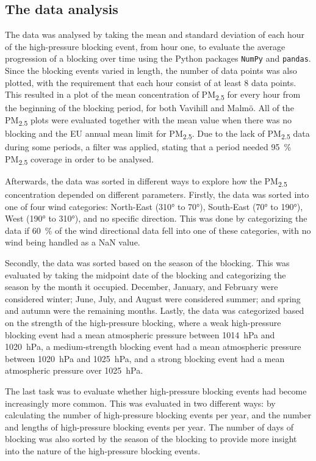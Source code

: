 \subsection{The data analysis}
The data was analysed by taking the mean and standard deviation of each hour of the high-pressure blocking event, from hour one, to evaluate the average progression of a blocking over time using the Python packages \texttt{NumPy} and \texttt{pandas}. Since the blocking events varied in length, the number of data points was also plotted, with the requirement that each hour consist of at least 8 data points. This resulted in a plot of the mean concentration of PM\textsubscript{2.5} for every hour from the beginning of the blocking period, for both Vavihill and Malmö. All of the PM\textsubscript{2.5} plots were evaluated together with the mean value when there was no blocking and the EU annual mean limit for PM\textsubscript{2.5}. Due to the lack of PM\textsubscript{2.5} data during some periods, a filter was applied, stating that a period needed \SI{95}{\%} PM\textsubscript{2.5} coverage in order to be analysed.

Afterwards, the data was sorted in different ways to explore how the PM\textsubscript{2.5} concentration depended on different parameters. Firstly, the data was sorted into one of four wind categories: North-East (310° to 70°), South-East (70° to 190°), West (190° to 310°), and no specific direction. This was done by categorizing the data if \SI{60}{\%} of the wind directional data fell into one of these categories, with no wind being handled as a NaN value.

Secondly, the data was sorted based on the season of the blocking. This was evaluated by taking the midpoint date of the blocking and categorizing the season by the month it occupied. December, January, and February were considered winter; June, July, and August were considered summer; and spring and autumn were the remaining months. Lastly, the data was categorized based on the strength of the high-pressure blocking, where a weak high-pressure blocking event had a mean atmospheric pressure between \SI{1014}{\hecto\pascal} and \SI{1020}{\hecto\pascal}, a medium-strength blocking event had a mean atmospheric pressure between \SI{1020}{\hecto\pascal} and \SI{1025}{\hecto\pascal}, and a strong blocking event had a mean atmospheric pressure over \SI{1025}{\hecto\pascal}.

The last task was to evaluate whether high-pressure blocking events had become increasingly more common. This was evaluated in two different ways: by calculating the number of high-pressure blocking events per year, and the number and lengths of high-pressure blocking events per year. The number of days of blocking was also sorted by the season of the blocking to provide more insight into the nature of the high-pressure blocking events. 

